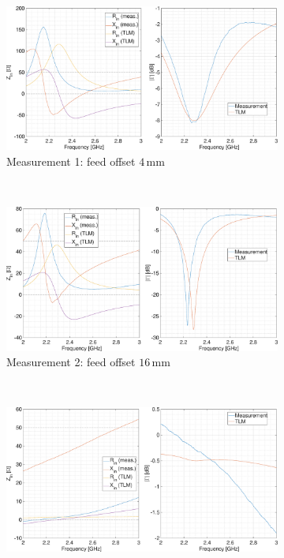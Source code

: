 \documentclass[11pt,a4paper]{article}
\begin{document}
            \begin{figure}[!ht]
            \centering
                \begin{subfigure}{.8\textwidth}
                    \centering
                    \includegraphics[width=\textwidth]{src/measurement1.eps}
                    \caption{\label{fig:measurement1}Measurement 1: feed offset $4\, \mathrm{mm}$}
                \end{subfigure}\\[.5cm]
                \begin{subfigure}{.8\textwidth}
                    \centering
                    \includegraphics[width=\textwidth]{src/measurement2.eps}
                    \caption{\label{fig:measurement2}Measurement 2: feed offset $16\, \mathrm{mm}$}
                \end{subfigure}\\[.5cm]
                \begin{subfigure}{.8\textwidth}
                    \centering
                    \includegraphics[width=\textwidth]{src/measurement3.eps}

\end{subfigure}
\end{figure}
\end{document}
